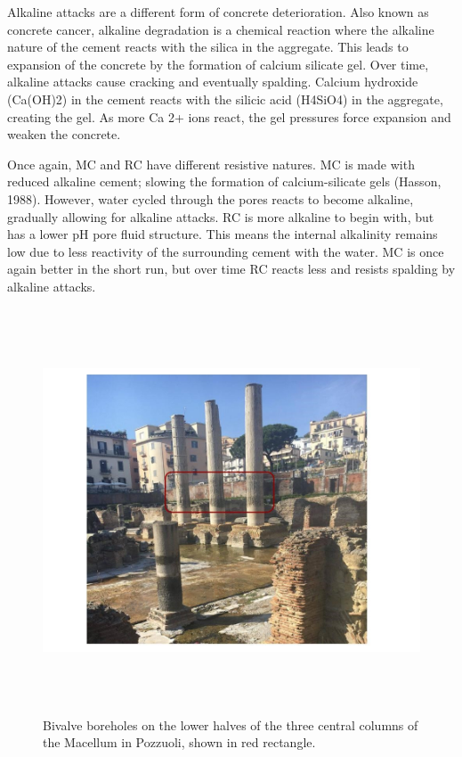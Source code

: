 \documentclass[12pt]{article}
\begin{document}
Alkaline attacks are a different form of concrete deterioration. Also known as concrete cancer, alkaline degradation is a chemical reaction where the alkaline nature of the cement reacts with the silica in the aggregate. This leads to expansion of the concrete by the formation of calcium silicate gel. Over time, alkaline attacks cause cracking and eventually spalding. Calcium hydroxide (Ca(OH)2) in the cement reacts with the silicic acid (H4SiO4) in the aggregate, creating the gel. As more Ca 2+ ions react, the gel pressures force expansion and weaken the concrete.

Once again, MC and RC have different resistive natures. MC is made with reduced alkaline cement; slowing the formation of calcium-silicate gels (Hasson, 1988). However, water cycled through the pores reacts to become alkaline, gradually allowing for alkaline attacks. RC is more alkaline to begin with, but has a lower pH pore fluid structure. This means the internal alkalinity remains low due to less reactivity of the surrounding cement with the water. MC is once again better in the short run, but over time RC reacts less and resists spalding by alkaline attacks. 

\begin{figure}[ht]
  \includegraphics[width=\textwidth,height=12cm]{Bivalve_boreholes}
  \caption{Bivalve boreholes on the lower halves of the three central columns of the Macellum in Pozzuoli, shown in red rectangle.}
\end{figure}
\end{document}
